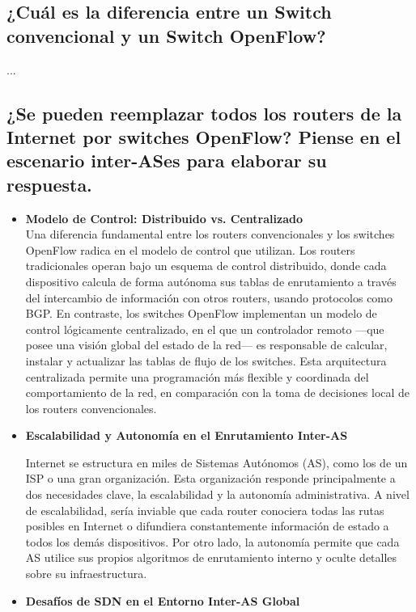 \documentclass[titlepage,a4paper]{article}
\begin{document}
    \subsection{¿Cuál es la diferencia entre un Switch convencional y un Switch OpenFlow?}

    ...
     
    \subsection{¿Se pueden reemplazar todos los routers de la Internet por switches OpenFlow? Piense en el escenario inter-ASes para elaborar su respuesta.}

    \begin{itemize}
        \item \textbf{Modelo de Control: Distribuido vs. Centralizado}
        \\ Una diferencia fundamental entre los routers convencionales y los switches OpenFlow radica en el modelo de control que utilizan. Los routers tradicionales operan bajo un esquema de control distribuido, donde cada dispositivo calcula de forma autónoma sus tablas de enrutamiento a través del intercambio de información con otros routers, usando protocolos como BGP. En contraste, los switches OpenFlow implementan un modelo de control lógicamente centralizado, en el que un controlador remoto —que posee una visión global del estado de la red— es responsable de calcular, instalar y actualizar las tablas de flujo de los switches. Esta arquitectura centralizada permite una programación más flexible y coordinada del comportamiento de la red, en comparación con la toma de decisiones local de los routers convencionales. \\
        
        \item \textbf{Escalabilidad y Autonomía en el Enrutamiento Inter-AS}

        Internet se estructura en miles de Sistemas Autónomos (AS), como los de un ISP o una gran organización. Esta organización responde principalmente a dos necesidades clave, la escalabilidad y la autonomía administrativa. A nivel de escalabilidad, sería inviable que cada router conociera todas las rutas posibles en Internet o difundiera constantemente información de estado a todos los demás dispositivos. Por otro lado, la autonomía permite que cada AS utilice sus propios algoritmos de enrutamiento interno y oculte detalles sobre su infraestructura.

        \item \textbf{Desafíos de SDN en el Entorno Inter-AS Global}


\end{itemize}
\end{document}
